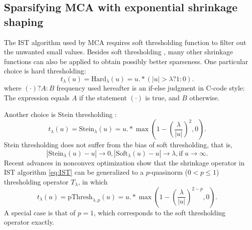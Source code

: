 \subsection{Sparsifying MCA with exponential shrinkage shaping}

The IST algorithm used by MCA requires soft thresholding function to filter out the unwanted small values. Besides soft thresholding \citep{donoho1995noising}, many other shrinkage functions can also be applied to obtain possibly better sparseness. One particular choice is hard thresholding:
\begin{equation}
t_{\lambda}(u)=\mathrm{Hard}_{\lambda}(u)=u.*(|u|>\lambda?1:0).
\end{equation}
where $(\cdot)?A:B$ frequency used hereafter is an if-else judgment in C-code style:  The expression equals $A$ if the statement $(\cdot)$ is true, and $B$ otherwise.

Another choice is Stein thresholding \citep{peyre2010advanced,mallat2009}:
\begin{equation}\label{eq:stein}
t_{\lambda}(u)=\mathrm{Stein}_{\lambda}(u)=u.*\max\left(1-(\frac{\lambda}{|u|})^{2},0\right).
\end{equation}
Stein thresholding does not suffer from the bias of soft thresholding, that is,
\begin{equation}
|\mathrm{Stein}_{\lambda}(u)-u| \rightarrow 0, |\mathrm{Soft}_{\lambda}(u)-u|\rightarrow \lambda,
\mathrm{if}\; u\rightarrow\infty.
\end{equation}
Recent advances in nonconvex optimization \citep{chartrand2012,chartrand2013generalized,chartrand2013nonconvex} show that the shrinkage operator in IST algorithm \eqref{eq:IST} can be generalized to a $p$-quasinorm ($0<p\leq1$) thresholding operator $T_{\lambda}$, in which
\begin{equation}\label{eq:pthresh}
t_{\lambda}(u)=\mathrm{pThresh}_{\lambda,p}(u)=u.*\max\left(1-(\frac{\lambda}{|u|})^{2-p},0\right).
\end{equation}
A special case is that of $p=1$, which corresponds to the soft thresholding operator exactly.



